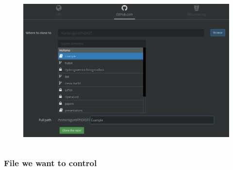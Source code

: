 \begin{frame}
\begin{columns}
\begin{column}{0.6\textwidth}
\begin{figure}
\begin{overprint}
					\includegraphics[width=\textwidth]{./pictures/kraken_clone.png}
				\end{overprint}
			\end{figure}
		\end{column}
	\end{columns}
\end{frame}
\begin{frame}[fragile]
	\frametitle{File we want to control}
\end{frame}
